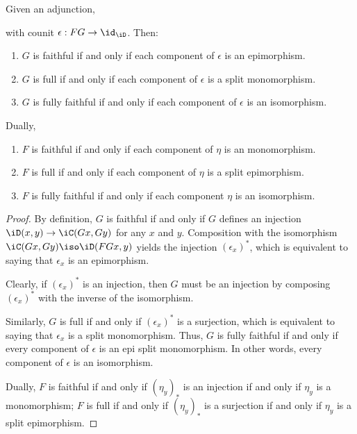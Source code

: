 \documentclass{amsart}
\begin{document}
\begin{lem}
  Given an adjunction,
  
  with counit $\epsilon : FG \to \id_{\iD}$.
  Then:
  \begin{enumerate}
  \item $G$ is faithful if and only if each component of $\epsilon$ is an epimorphism.
  \item $G$ is full if and only if each component of $\epsilon$ is a split monomorphism.
  \item $G$ is fully faithful if and only if each component of $\epsilon$ is an isomorphism.
  \end{enumerate}
  Dually,
  \begin{enumerate}
  \item $F$ is faithful if and only if each component of $\eta$ is an monomorphism.
  \item $F$ is full if and only if each component of $\eta$ is a split epimorphism.
  \item $F$ is fully faithful if and only if each component $\eta$ is an isomorphism.
  \end{enumerate}
\end{lem}
\begin{proof}
  By definition, $G$ is faithful if and only if $G$ defines an injection $\iD(x,y) \to \iC(Gx,Gy)$ for any $x$ and $y$.
  Composition with the isomorphism $\iC(Gx,Gy) \iso \iD(FGx,y)$ yields the injection $(\epsilon_{x})^{*}$, which is equivalent to saying that $\epsilon_{x}$ is an epimorphism.
  
  Clearly, if $(\epsilon_{x})^{*}$ is an injection, then $G$ must be an injection by composing $(\epsilon_{x})^{*}$ with the inverse of the isomorphism.

  Similarly, $G$ is full if and only if $(\epsilon_{x})^{*}$ is a surjection, which is equivalent to saying that $\epsilon_{x}$ is a split monomorphism.
  Thus, $G$ is fully faithful if and only if every component of $\epsilon$ is an epi split monomorphism.
  In other words, every component of $\epsilon$ is an isomorphism.

  Dually, $F$ is faithful if and only if $(\eta_{y})_{*}$ is an injection if and only if $\eta_{y}$ is a monomorphism; $F$ is full if and only if $(\eta_{y})_{*}$ is a surjection if and only if $\eta_{y}$ is a split epimorphism.
  
\end{proof}
\end{document}
